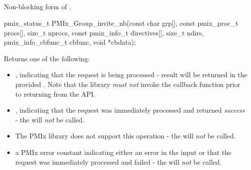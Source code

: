 \subsection{}

\summary

Non-blocking form of .

\format

\cspecificstart
\begin{codepar}
pmix_status_t
PMIx_Group_invite_nb(const char grp[],
                     const pmix_proc_t procs[], size_t nprocs,
                     const pmix_info_t directives[], size_t ndirs,
                     pmix_info_cbfunc_t cbfunc, void *cbdata);
\end{codepar}
\cspecificend

\begin{arglist}
\end{arglist}

Returns one of the following:

\begin{itemize}
    \item {}, indicating that the request is being processed - result will be returned in the provided . Note that the library \emph{must not} invoke the callback function prior to returning from the \ac{API}.
    \item {}, indicating that the request was immediately processed and returned \textit{success} - the  will \textit{not} be called.
    \item {} The \ac{PMIx} library does not support this operation - the  will \textit{not} be called.
    \item a PMIx error constant indicating either an error in the input or that the request was immediately processed and failed - the  will \textit{not} be called.
\end{itemize}


